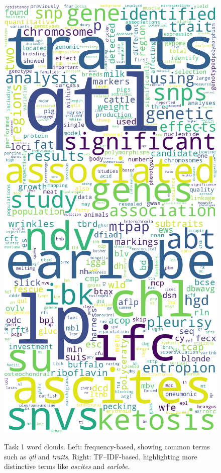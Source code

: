 \documentclass[11pt]{article}
\begin{document}
\begin{figure}[t]
  \centering
  \includegraphics[width=0.48\linewidth]{../outputs/freq_wordcloud_task1.png} \hfill
  \includegraphics[width=0.48\linewidth]{../outputs/tfidf_wordcloud_task1.png}
  \caption{Task 1 word clouds. Left: frequency-based, showing common terms such as \textit{qtl} and \textit{traits}. 
  Right: TF--IDF-based, highlighting more distinctive terms like \textit{ascites} and \textit{earlobe}.}
  \label{fig:wc_task1}
\end{figure}
\end{document}
